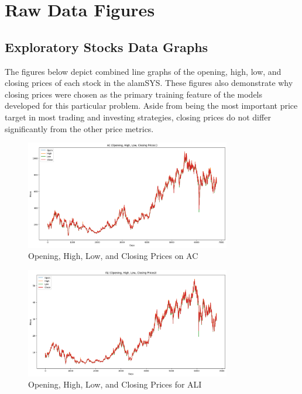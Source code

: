 \chapter{Raw Data Figures}
\label{sec:appendix_b}

\section{Exploratory Stocks Data Graphs}
\label{sec:stock_ohlc}
The figures below depict combined line graphs of the opening, high, low, and 
closing prices of each stock in the alamSYS. These figures also demonstrate why 
closing prices were chosen as the primary training feature of the models developed 
for this particular problem. Aside from being the most important price target in most 
trading and investing strategies, closing prices do not differ significantly from the 
other price metrics.

\begin{figure}[ht]
    \centering
    \includegraphics[width=0.80\textwidth]{./assets/Appendices/B/OHLC_Prices/AC.png}
    \caption{Opening, High, Low, and Closing Prices on AC}
    \label{fig:ohlc_AC}
\end{figure}
\FloatBarrier
    
\begin{figure}[ht]
    \centering
    \includegraphics[width=0.80\textwidth]{./assets/Appendices/B/OHLC_Prices/ALI.png}
    \caption{Opening, High, Low, and Closing Prices for ALI}
    \label{fig:ohlc_ALI}
\end{figure}
\FloatBarrier

